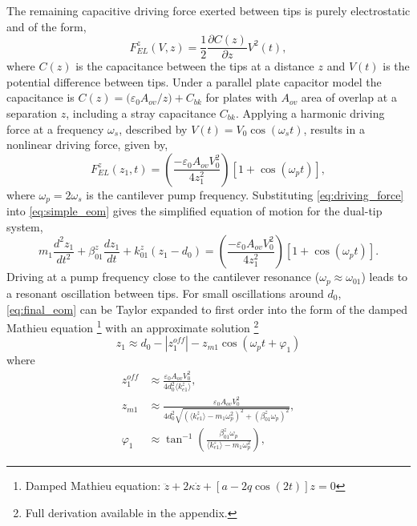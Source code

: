 \documentclass{article}
\begin{document}
The remaining capacitive driving force exerted between tips is purely electrostatic and of the form,
\begin{equation} F_{EL}^z(V,z) = \frac{1}{2} \frac{\partial C(z)}{\partial z} V^2(t), \end{equation}
where $C(z)$ is the capacitance between the tips at a distance $z$ and $V(t)$ is the potential difference between tips. Under a parallel plate capacitor model the capacitance is $C(z) = {(\varepsilon_0 A_{ov}}/{z}) + C_{bk}$ for plates with $A_{ov}$ area of overlap at a separation $z$, including a stray capacitance $C_{bk}$. Applying a harmonic driving force at a frequency $\omega_s$, described by $V(t)=V_0 \cos(\omega_s t)$, results in a nonlinear driving force, given by,
\begin{equation}
	F_{EL}^z(z_1,t) = \left(\frac{-\varepsilon_0 A_{ov} V_0^2}{4z_1^2}\right)\left[1+\cos(\omega_pt)\right],
	\label{eq:driving_force}
\end{equation}
where $\omega_p = 2\omega_s$ is the cantilever pump frequency.
Substituting \eqref{eq:driving_force} into \eqref{eq:simple_eom} gives the simplified equation of motion for the dual-tip system,
\begin{equation}
m_1 \frac{d^2z_1}{dt^2} + \beta_{01}^z \frac{dz_1}{dt} + k_{01}^z (z_1-d_0) = \left( \frac{-\varepsilon_0 A_{ov} V_0^2}{4z_1^2}\right)\left[1+\cos(\omega_pt)\right].
\label{eq:final_eom}
\end{equation}
Driving at a pump frequency close to the cantilever resonance ($\omega_p \approx \omega_{01}$) leads to a resonant oscillation between tips. For small oscillations around $d_0$, \eqref{eq:final_eom} can be Taylor expanded to first order into the form of the damped Mathieu equation%
\footnote{Damped Mathieu equation: $\ddot{z} + 2\kappa\dot{z} + [a - 2q\cos(2t)]z = 0$}
with an approximate solution%
\footnote{Full derivation available in the appendix.}
\begin{equation}
z_1 \approx d_0 - \left|z_{1}^{off}\right| - z_{m1}\cos(\omega_pt+\varphi_1)
\label{eq:tip_oscillation}
\end{equation}
where
\begin{subequations}
\begin{align}
z_1^{off} &\approx %
\frac{ \varepsilon_0 A_{ov} V_0^2 }{ 4d_0^2 \langle k_{e1}^z \rangle }, \\
%
z_{m1} &\approx %
\frac{ \varepsilon_0 A_{ov} V_0^2 }%
{ 4d_0^2 \sqrt{ (\langle k_{e1}^z \rangle - m_1\omega_p^2)^2 + (\beta_{01}^z\omega_p)^2  } }, \label{eq:tip_amp} \\
%
\varphi_1 &\approx \tan^{-1}\left(\frac{\beta_{01}^{z}\omega_{p}}{\langle k_{e1}^{z} \rangle -m_{1}\omega_{p}^{2}}\right), \label{eq:tip_phase}
\end{align}
\end{subequations}
\end{document}
